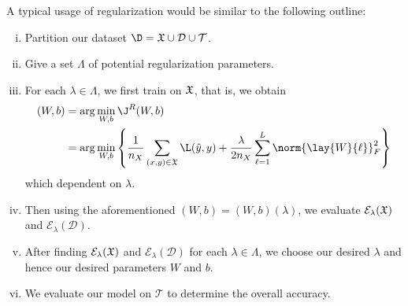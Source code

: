 A typical usage of regularization would be similar to the following outline:
\begin{enumerate}[i.]
	\item Partition our dataset $\D=\frak{X}\cup\mathcal{D}\cup\mathcal{T}$.
	\item Give a set $\Lambda$ of potential regularization parameters.
	\item For each $\lambda\in\Lambda$, we first train on $\frak{X}$, that is, we obtain
		\begin{align*}
			(W,b)&=\arg\min_{W,b}\J^R(W,b)\\
			&=\arg\min_{W,b}\left\{\frac{1}{n_X}\sum_{(x,y)\in\frak{X}}\L(\hat{y},y)+\frac{\lambda}{2n_X}\sum_{\ell=1}^L\norm{\lay{W}{\ell}}_F^2\right\}
		\end{align*}
		which dependent on $\lambda$.
	\item Then using the aforementioned $(W,b)=(W,b)(\lambda)$, we evaluate $\mathcal{E}_\lambda(\frak{X})$ and $\mathcal{E}_\lambda(\mathcal{D})$.
	\item After finding $\mathcal{E}_\lambda(\frak{X})$ and $\mathcal{E}_\lambda(\mathcal{D})$ for each $\lambda\in\Lambda$, we choose our desired $\lambda$ and hence our desired parameters $W$ and $b$.
	\item We evaluate our model on $\mathcal{T}$ to determine the overall accuracy.
\end{enumerate}



